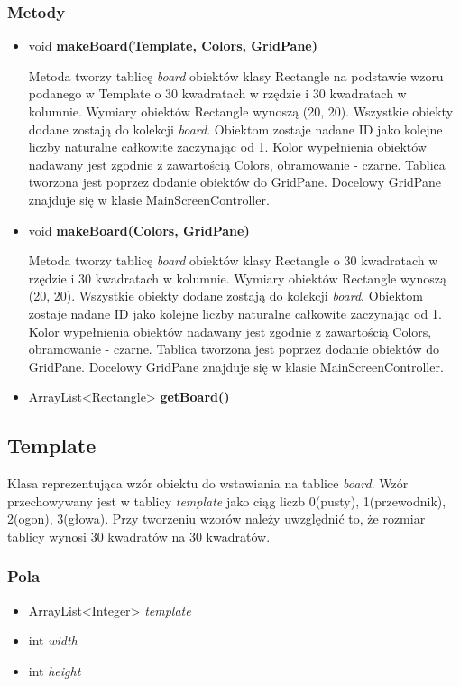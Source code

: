 \documentclass[a4paper,11pt]{article}
\begin{document}
\subsubsection{Metody}
\begin{itemize}
\item void \textbf{makeBoard(Template, Colors, GridPane)}

Metoda tworzy tablicę \textit{board} obiektów klasy Rectangle na podstawie wzoru podanego w Template o 30 kwadratach w rzędzie i 30 kwadratach w kolumnie.
Wymiary obiektów Rectangle wynoszą (20, 20).
Wszystkie obiekty dodane zostają do kolekcji \textit{board}.
Obiektom zostaje nadane ID jako kolejne liczby naturalne całkowite zaczynając od 1.
Kolor wypełnienia obiektów nadawany jest zgodnie z zawartością Colors, obramowanie - czarne.
Tablica tworzona jest poprzez dodanie obiektów do  GridPane.
Docelowy GridPane znajduje się w klasie MainScreenController.
\item void \textbf{makeBoard(Colors, GridPane)}

Metoda tworzy tablicę \textit{board} obiektów klasy Rectangle o 30 kwadratach w rzędzie i 30 kwadratach w kolumnie.
Wymiary obiektów Rectangle wynoszą (20, 20).
Wszystkie obiekty dodane zostają do kolekcji \textit{board}.
Obiektom zostaje nadane ID jako kolejne liczby naturalne całkowite zaczynając od 1.
Kolor wypełnienia obiektów nadawany jest zgodnie z zawartością Colors, obramowanie - czarne.
Tablica tworzona jest poprzez dodanie obiektów do  GridPane.
Docelowy GridPane znajduje się w klasie MainScreenController.

\item ArrayList<Rectangle> \textbf{getBoard()}
\end{itemize}



\subsection{Template}
Klasa reprezentująca wzór obiektu do wstawiania na tablice \textit{board}. Wzór przechowywany jest w tablicy \textit{template} jako ciąg liczb 0(pusty), 1(przewodnik), 2(ogon), 3(głowa). Przy tworzeniu wzorów należy uwzględnić to, że rozmiar tablicy wynosi 30 kwadratów na 30 kwadratów. 
\subsubsection{Pola}
\begin{itemize}
\item ArrayList<Integer> \textit{template}
\item int \textit{width}
\item int \textit{height}
\end{itemize}
\end{document}
